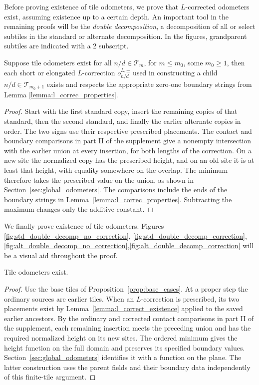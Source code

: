 \documentclass[12pt]{amsart}
\begin{document}
Before proving existence of tile odometers, we prove that $L$-corrected odometers exist, assuming existence up to a
certain depth. An important tool in the remaining proofs will be the {\it double decomposition}, a decomposition of all or select subtiles
in the standard or alternate decomposition. In the figures, grandparent subtiles are indicated with a 2 subscript. 

\begin{lemma} \label{lemma:l_correct_existence}
	Suppose tile odometers exist for all $n/d \in \mathcal{T}_m$, for $m \leq m_0$, some $m_0 \geq 1$, 
	then each short or elongated $L$-correction $o^{L,\pm}_{n/d}$ used in constructing a child $n/d\in\mathcal T_{m_0+1}$ exists and respects
	the appropriate zero-one boundary strings from Lemma \ref{lemma:l_correc_properties}.
\end{lemma} 

\begin{proof}
Start with the first standard copy, insert the remaining copies of that standard, then the second standard, and finally the earlier alternate copies in order. The two signs use their respective prescribed placements. The contact and boundary comparisons in part II of the supplement give a nonempty intersection with the earlier union at every insertion, for both lengths of the correction. On a new site the normalized copy has the prescribed height, and on an old site it is at least that height, with equality somewhere on the overlap. The minimum therefore takes the prescribed value on the union, as shown in Section~\ref{sec:global_odometers}. The comparisons include the ends of the boundary strings in Lemma~\ref{lemma:l_correc_properties}. Subtracting the maximum changes only the additive constant.
\end{proof}



We finally prove existence of tile odometers. Figures \ref{fig:std_double_decomp_no_correction}, \ref{fig:std_double_decomp_correction},\ref{fig:alt_double_decomp_no_correction},\ref{fig:alt_double_decomp_correction}
will be a visual aid throughout the proof. 
\begin{lemma} \label{lemma:tile-odometer-existence}
	Tile odometers exist. 
\end{lemma}

\begin{proof}
Use the base tiles of Proposition~\ref{prop:base_cases}. At a proper step the ordinary sources are earlier tiles. When an $L$-correction is prescribed, its two placements exist by Lemma~\ref{lemma:l_correct_existence} applied to the saved earlier ancestors. By the ordinary and corrected contact comparisons in part II of the supplement, each remaining insertion meets the preceding union and has the required normalized height on its new sites. The ordered minimum gives the height function on the full domain and preserves its specified boundary values. Section~\ref{sec:global_odometers} identifies it with a function on the plane. The latter construction uses the parent fields and their boundary data independently of this finite-tile argument.
\end{proof}
\end{document}
